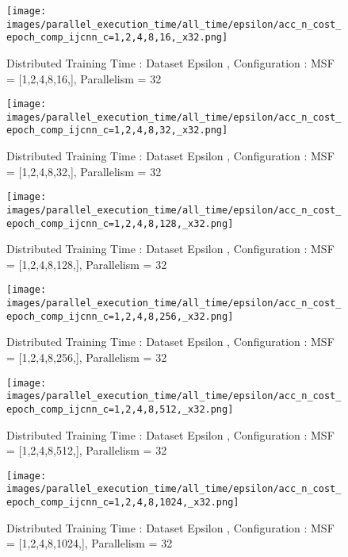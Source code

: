 \begin{figure*}[htbp]
\centering
\texttt{[image: images/parallel\_execution\_time/all\_time/epsilon/acc\_n\_cost\_epoch\_comp\_ijcnn\_c=1,2,4,8,16,\_x32.png]}
\caption{Distributed Training Time : Dataset Epsilon , Configuration : MSF = [1,2,4,8,16,], Parallelism = 32}
\label{fig:dis-msf-tr-time-epsilon-x32}
\end{figure*}


\begin{figure*}[htbp]
\centering
\texttt{[image: images/parallel\_execution\_time/all\_time/epsilon/acc\_n\_cost\_epoch\_comp\_ijcnn\_c=1,2,4,8,32,\_x32.png]}
\caption{Distributed Training Time : Dataset Epsilon , Configuration : MSF = [1,2,4,8,32,], Parallelism = 32}
\label{fig:dis-msf-tr-time-epsilon-x32}
\end{figure*}


\begin{figure*}[htbp]
\centering
\texttt{[image: images/parallel\_execution\_time/all\_time/epsilon/acc\_n\_cost\_epoch\_comp\_ijcnn\_c=1,2,4,8,128,\_x32.png]}
\caption{Distributed Training Time : Dataset Epsilon , Configuration : MSF = [1,2,4,8,128,], Parallelism = 32}
\label{fig:dis-msf-tr-time-epsilon-x32}
\end{figure*}


\begin{figure*}[htbp]
\centering
\texttt{[image: images/parallel\_execution\_time/all\_time/epsilon/acc\_n\_cost\_epoch\_comp\_ijcnn\_c=1,2,4,8,256,\_x32.png]}
\caption{Distributed Training Time : Dataset Epsilon , Configuration : MSF = [1,2,4,8,256,], Parallelism = 32}
\label{fig:dis-msf-tr-time-epsilon-x32}
\end{figure*}


\begin{figure*}[htbp]
\centering
\texttt{[image: images/parallel\_execution\_time/all\_time/epsilon/acc\_n\_cost\_epoch\_comp\_ijcnn\_c=1,2,4,8,512,\_x32.png]}
\caption{Distributed Training Time : Dataset Epsilon , Configuration : MSF = [1,2,4,8,512,], Parallelism = 32}
\label{fig:dis-msf-tr-time-epsilon-x32}
\end{figure*}


\begin{figure*}[htbp]
\centering
\texttt{[image: images/parallel\_execution\_time/all\_time/epsilon/acc\_n\_cost\_epoch\_comp\_ijcnn\_c=1,2,4,8,1024,\_x32.png]}
\caption{Distributed Training Time : Dataset Epsilon , Configuration : MSF = [1,2,4,8,1024,], Parallelism = 32}
\label{fig:dis-msf-tr-time-epsilon-x32}
\end{figure*}


